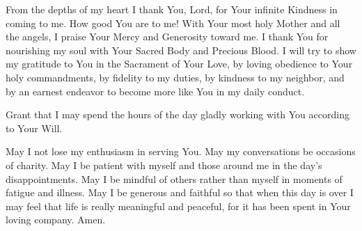 From the depths of my heart I thank You, Lord, for Your infinite Kindness in coming to me.
How good You are to me!
With Your most holy Mother and all the angels, I praise Your Mercy and Generosity toward me.
I thank You for nourishing my soul with Your Sacred Body and Precious Blood.
I will try to show my gratitude to You in the Sacrament of Your Love, by loving obedience to Your holy commandments, by fidelity to my duties, by kindness to my neighbor, and by an earnest endeavor to become more like You in my daily conduct.

Grant that I may spend the hours of the day gladly working with You according to Your Will.

May I not lose my enthusiasm in serving You.
May my conversations be occasions of charity.
May I be patient with myself and those around me in the day's disappointments.
May I be mindful of others rather than myself in moments of fatigue and illness.
May I be generous and faithful so that when this day is over I may feel that life is really meaningful and peaceful, for it has been spent in Your loving company.
Amen.

\newpage